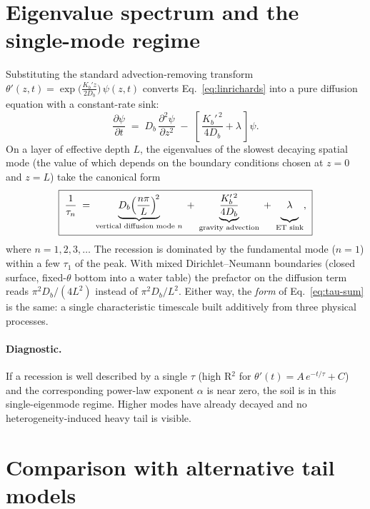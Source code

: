 \documentclass[11pt]{article}
\newcommand{\dpartial}[2]{\frac{\partial #1}{\partial #2}}
\begin{document}
\section{Eigenvalue spectrum and the single-mode regime}

Substituting the standard advection-removing transform
$\theta'(z,t) = \exp\!\big(\frac{K_b' z}{2 D_b}\big)\,\psi(z,t)$ converts
Eq.~\eqref{eq:linrichards} into a pure diffusion equation with a
constant-rate sink:
\begin{equation}
    \dpartial{\psi}{t}
    \;=\;
    D_b\,\dpartial{^2\psi}{z^2}
    \;-\;
    \left[\,\frac{K_b'^{\,2}}{4 D_b} + \lambda\,\right]\!\psi.
\end{equation}
On a layer of effective depth $L$, the eigenvalues of the slowest
decaying spatial mode (the value of which depends on the boundary
conditions chosen at $z=0$ and $z=L$) take the canonical form
\begin{equation}
    \boxed{\;
    \frac{1}{\tau_n}
    \;=\;
    \underbrace{D_b\!\left(\frac{n\pi}{L}\right)^{\!2}}_{\text{vertical
        diffusion mode } n}
    \;+\;
    \underbrace{\frac{K_b'^{\,2}}{4 D_b}}_{\text{gravity
        advection}}
    \;+\;
    \underbrace{\vphantom{\frac{K_b'^{\,2}}{4 D_b}}\lambda}_{\text{ET sink}},
    \;}
    \label{eq:tau-sum}
\end{equation}
where $n=1,2,3,\dots$ The recession is dominated by the fundamental
mode ($n=1$) within a few $\tau_1$ of the peak. With
mixed Dirichlet--Neumann boundaries (closed surface, fixed-$\theta$
bottom into a water table) the prefactor on the diffusion term reads
$\pi^2 D_b/(4 L^2)$ instead of $\pi^2 D_b/L^2$. Either way, the
\emph{form} of Eq.~\eqref{eq:tau-sum} is the same: a single
characteristic timescale built additively from three physical
processes.

\paragraph{Diagnostic.} If a recession is well described by a single
$\tau$ (high R$^2$ for $\theta'(t) = A\,e^{-t/\tau} + C$) and the
corresponding power-law exponent $\alpha$ is near zero, the soil is in
this single-eigenmode regime. Higher modes have already decayed and
no heterogeneity-induced heavy tail is visible.

\section{Comparison with alternative tail models}
\end{document}
